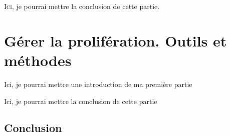 \documentclass[12pt,twoside]{book}
\begin{document}
	
	
	
	
	
	\bigskip
	\lettrine{I}{ci}, je pourrai mettre la conclusion  de cette partie.
	
	
	\part{Gérer la prolifération. Outils et méthodes}
	
	
	
	Ici, je pourrai mettre une introduction de ma première partie
	
	
	
	
	
	
	
	Ici, je pourrai mettre la conclusion de cette partie
	
	
	\chapter*{Conclusion}
	\newpage{\pagestyle{empty}\cleardoublepage}
	
	
	
	
	
	
	
	
	
\end{document}
